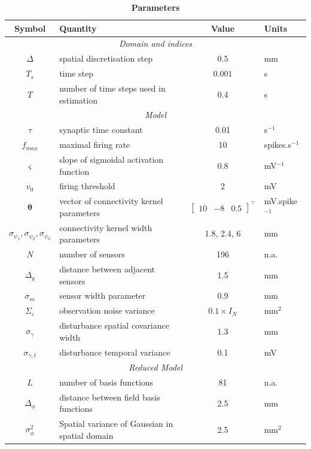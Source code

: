 \documentclass[10pt]{article}
\begin{document}
\begin{table}[!ht]
\caption{
\bf{Parameters}}
\begin{tabular}{|c|l|c|l|}
	\hline
	\textbf{Symbol} & \textbf{Quantity} & \textbf{Value} & \textbf{Units}\\
	\hline
	\multicolumn{4}{|c|}{\emph{Domain and indices}}\\
	\hline
	$\Delta$ & spatial discretisation step & 0.5 & mm \\
	$T_s$ & time step & $0.001$ & s\\
	$T$ & number of time steps used in estimation & 0.4 & s\\
	\hline 
\multicolumn{4}{|c|}{\emph{Model}}\\
	\hline
	$\tau$ & synaptic time constant & 0.01 & s$^{-1}$ \\
	$f_{max}$ & maximal firing rate & 10 & spikes.s$^{-1}$\\
	$\varsigma$ & slope of sigmoidal activation function & 0.8 & mV$^{-1}$\\
	$v_0$ & firing threshold & 2 & mV \\
	$\boldsymbol{\theta}$ & vector of connectivity kernel parameters & $\left[\begin{array}{ccc}
	10 &-8 &0.5
	\end{array}
	\right]^{\top}$ & mV.spike$^{-1}$\\
	$\sigma_{\psi_{1}}, \sigma_{\psi_{2}}, \sigma_{\psi_{3}}$ & connectivity kernel width parameters & 1.8, 2.4, 6 & mm\\
	$N$ & number of sensors & 196 & n.a.\\ 
	$\Delta_y$ & distance between adjacent sensors & 1.5 & mm\\
	$\sigma_{m}$ & sensor width parameter & 0.9 & mm \\
	$\Sigma_{\varepsilon}$ & observation noise variance & $0.1 \times I_{N}$ & mm$^2$ \\
	$\sigma_{\gamma}$& disturbance spatial covariance width & 1.3 & mm\\
	$\sigma_{\gamma,t}$ & disturbance temporal variance & 0.1 & mV \\
	\hline 
	\multicolumn{4}{|c|}{\emph{Reduced Model}}\\
	\hline
	$L$ & number of basis functions& 81 & n.a.\\
	$\Delta_{\phi}$ & distance between field basis functions & 2.5 & mm \\
	$\sigma^2_{\phi}$ & Spatial variance of Gaussian in spatial domain & 2.5 & mm$^2$\\

\end{tabular}
\end{table}
\end{document}
